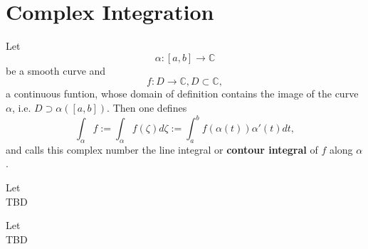 \section{Complex Integration}

\begin{definition}
    \label{sec:ContourIntegral}
    Let
    $$\alpha : [a, b] \rightarrow \mathbb{C}$$
    be a smooth curve and
    $$f: D \rightarrow \mathbb{C}, D \subset \mathbb{C},$$
    a continuous funtion, whose domain of definition contains the image of the curve $\alpha$,
    i.e. $D \supset \alpha([a,b]).$ Then one defines
    $$ \int_\alpha f:= \int_\alpha f(\zeta) d\zeta := \int_a^b f(\alpha(t))\alpha'(t)dt,$$
    and calls this complex number the line integral or \textbf{contour integral} of $f$ along $\alpha$.
\end{definition}

\begin{theorem}
    \label{sec:EstimationTheorem}
    Let \\
    TBD
\end{theorem}

\begin{theorem}
    \label{sec:Cauchy IF}
    Let \\
    TBD
\end{theorem}